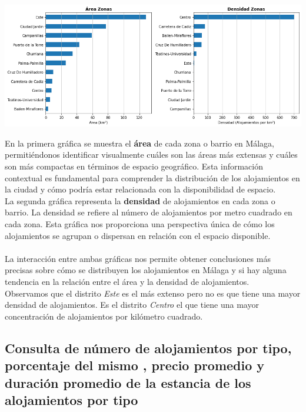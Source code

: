 \begin{center}
    \includegraphics[width=1\textwidth]{capturas/2.png}
\end{center}

En la primera gráfica se muestra el \textbf{área} de cada zona o barrio en Málaga, permitiéndonos identificar visualmente cuáles son las áreas más extensas y cuáles son más compactas en términos de espacio geográfico. Esta información contextual es fundamental para comprender la distribución de los alojamientos en la ciudad y cómo podría estar relacionada con la disponibilidad de espacio.\\

La segunda gráfica representa la \textbf{densidad} de alojamientos en cada zona o barrio. La densidad se refiere al número de alojamientos por metro cuadrado en cada zona. Esta gráfica nos proporciona una perspectiva única de cómo los alojamientos se agrupan o dispersan en relación con el espacio disponible. \\\\La interacción entre ambas gráficas nos permite obtener conclusiones más precisas sobre cómo se distribuyen los alojamientos en Málaga y si hay alguna tendencia en la relación entre el área y la densidad de alojamientos.\\
Observamos que el distrito \textit{Este} es el más extenso pero no es que tiene una mayor densidad de alojamientos. Es el distrito \textit{Centro} el que tiene una mayor concentración de alojamientos por kilómetro cuadrado.

\subsection{Consulta de número de alojamientos por tipo, porcentaje del mismo , precio promedio y duración promedio de la estancia de los alojamientos por tipo}

